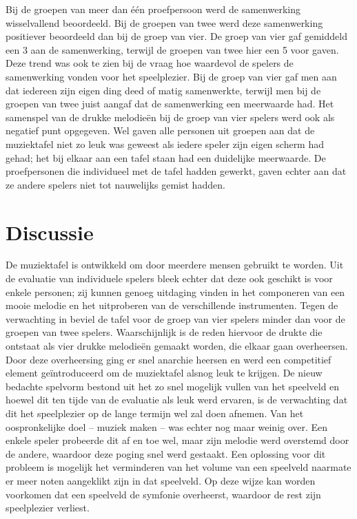 \documentclass{acm}
\begin{document}
Bij de groepen van meer dan \'e\'en proefpersoon werd de samenwerking wisselvallend beoordeeld. Bij de groepen van twee werd deze samenwerking positiever beoordeeld dan bij de groep van vier. De groep van vier gaf gemiddeld een 3 aan de samenwerking, terwijl de groepen van twee hier een 5 voor gaven. Deze trend was ook te zien bij de vraag hoe waardevol de spelers de samenwerking vonden voor het speelplezier. Bij de groep van vier gaf men aan dat iedereen zijn eigen ding deed of matig samenwerkte, terwijl men bij de groepen van twee juist aangaf dat de samenwerking een meerwaarde had. Het samenspel van de drukke melodie\"en bij de groep van vier spelers werd ook als negatief punt opgegeven. Wel gaven alle personen uit groepen aan dat de muziektafel niet zo leuk was geweest als iedere speler zijn eigen scherm had gehad; het bij elkaar aan een tafel staan had een duidelijke meerwaarde. De proefpersonen die individueel met de tafel hadden gewerkt, gaven echter aan dat ze andere spelers niet tot nauwelijks gemist hadden.

\section{Discussie}
\label{sec_discussie}
De muziektafel is ontwikkeld om door meerdere mensen gebruikt te worden. Uit de evaluatie van individuele spelers bleek echter dat deze ook geschikt is voor enkele personen; zij kunnen genoeg uitdaging vinden in het componeren van een mooie melodie en het uitproberen van de verschillende instrumenten. Tegen de verwachting in beviel de tafel voor de groep van vier spelers minder dan voor de groepen van twee spelers. Waarschijnlijk is de reden hiervoor de drukte die ontstaat als vier drukke melodie\"en gemaakt worden, die elkaar gaan overheersen. Door deze overheersing ging er snel anarchie heersen en werd een competitief element ge\"introduceerd om de muziektafel alsnog leuk te krijgen. De nieuw bedachte spelvorm bestond uit het zo snel mogelijk vullen van het speelveld en hoewel dit ten tijde van de evaluatie als leuk werd ervaren, is de verwachting dat dit het speelplezier op de lange termijn wel zal doen afnemen. Van het oospronkelijke doel -- muziek maken -- was echter nog maar weinig over. Een enkele speler probeerde dit af en toe wel, maar zijn melodie werd overstemd door de andere, waardoor deze poging snel werd gestaakt. Een oplossing voor dit probleem is mogelijk het verminderen van het volume van een speelveld naarmate er meer noten aangeklikt zijn in dat speelveld. Op deze wijze kan worden voorkomen dat een speelveld de symfonie overheerst, waardoor de rest zijn speelplezier verliest.
\end{document}
